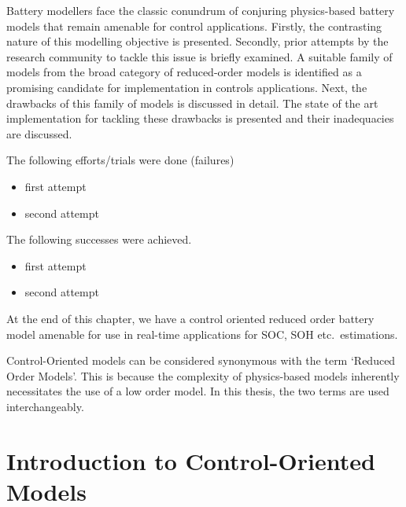 



\graphicspath{{4/figures/}}

Battery modellers face the classic conundrum of conjuring physics-based battery models that remain amenable for control
applications. Firstly, the contrasting nature of this modelling objective is presented. Secondly, prior attempts by the
research community to tackle this issue is briefly examined. A suitable family of models from the broad category of
reduced-order models is identified as a promising candidate for implementation in controls applications. Next, the
drawbacks of this family of models is discussed in detail. The state of the art implementation for tackling these
drawbacks is presented and their inadequacies are discussed.

 The following efforts/trials were done (failures)
\begin{itemize}
    \item first attempt
    \item second attempt
\end{itemize}
The following successes were achieved.
\begin{itemize}
    \item first attempt
    \item second attempt
\end{itemize}

At the end of this chapter, we have a control oriented reduced order battery model amenable for use in real-time
applications for SOC, SOH etc.\ estimations.

Control-Oriented models can be considered synonymous with the term `Reduced Order Models'. This is because the
complexity of physics-based models inherently necessitates the use of a low order model. In this thesis, the two terms
are used interchangeably.

\section{Introduction to Control-Oriented Models}

